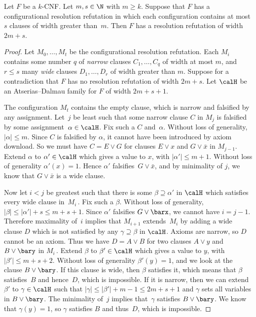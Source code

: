 \begin{theorem} \label{thm:total_space}
Let $F$ be a $k$-CNF.
Let $m, s \in \N$ with $m \ge k$.
Suppose that $F$ has a configurational resolution refutation in which
 each configuration
contains at most $s$ clauses of width greater than~$m$.
Then $F$ has a resolution refutation of width $2m+s$.
\end{theorem}

\begin{proof}
Let $M_0, \dots, M_t$ be the configurational resolution refutation. 
Each  $M_i$  contains some number $q$ of \emph{narrow} clauses 
$C_1, \dots, C_q$ of width at most $m$,
and $r \le s$ 
many \emph{wide} clauses $D_1, \dots, D_r$ of width greater than $m$.
Suppose
for a contradiction that $F$ has no resolution refutation of width $2m+s$. Let 
$\calH$ be an  Atserias--Dalmau family for $F$ of width $2m+s+1$.

The configuration $M_t$ contains the empty clause, which is narrow and falsified by any assignment.
Let~$j$ be least such that some narrow clause
$C$ in $M_j$ is falsified by some assignment~$\alpha \in \calH$. Fix such a $C$ and~$\alpha$.
Without loss of generality, $|\alpha|\le m$.
Since $C$ is falsified by $\alpha$, it cannot have been introduced by axiom download.
So we must have $C = E \vee G$ for clauses $E \vee x$ and $G \vee \bar{x}$ in $M_{j-1}$.
Extend $\alpha$ to $\alpha' \in \calH$ which gives a value to $x$, with $|\alpha'| \le m+1$. Without loss of
generality $\alpha'(x)=1$. Hence $\alpha'$ falsifies~$G \vee \bar{x}$, and by minimality
of $j$, we know that $G \vee \bar{x}$ is a wide clause.


Now let $i<j$ be greatest such that there is some $\beta \supseteq \alpha'$ in $\calH$ which
satisfies every wide clause in~$M_i$\,. Fix such a $\beta$. Without loss of generality,
 $|\beta| \le |\alpha'|+s \le m +s + 1$.
Since $\alpha'$ falsifies $G \vee \barx$,
we cannot have $i=j-1$. Therefore maximality of~$i$ implies that $M_{i+1}$ extends~$M_i$ by adding a
wide clause $D$ which is not satisfied by any $\gamma \supseteq \beta$ in $\calH$.
Axioms are narrow, so $D$ cannot be an axiom.
Thus we have $D = A \vee B$
for two clauses $A \vee y$ and $B \vee \bary$ in $M_i$\,.
Extend $\beta$ to $\beta' \in \calH$ which gives a value to $y$, with $|\beta'|\le m+s+2$.
Without loss of generality $\beta'(y)=1$, and we look at the clause $B \vee \bary$.
If this clause is wide, then $\beta$ satisfies it, which means that $\beta$ satisfies~$B$ and hence~$D$,
which is impossible. If it is narrow, then we can extend $\beta'$ to $\gamma \in \calH$
such that $|\gamma| \le |\beta'| + m - 1 \le 2m + s + 1$ and $\gamma$
sets all variables in $B \vee \bary$. The minimality of~$j$ implies that~$\gamma$
satisfies $B \vee \bary$. We know that $\gamma(y) = 1$, 
so $\gamma$ satisfies $B$ and thus~$D$, which is impossible.
\end{proof}


